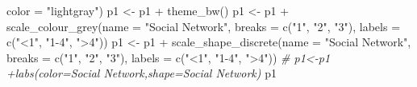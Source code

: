 \documentclass[
]{gitbook}
\newenvironment{Shaded}{\begin{snugshade}}{\end{snugshade}}
\newcommand{\AttributeTok}[1]{\textcolor[rgb]{0.77,0.63,0.00}{#1}}
\newcommand{\CommentTok}[1]{\textcolor[rgb]{0.56,0.35,0.01}{\textit{#1}}}
\newcommand{\FunctionTok}[1]{\textcolor[rgb]{0.00,0.00,0.00}{#1}}
\newcommand{\NormalTok}[1]{#1}
\newcommand{\OtherTok}[1]{\textcolor[rgb]{0.56,0.35,0.01}{#1}}
\newcommand{\SpecialCharTok}[1]{\textcolor[rgb]{0.00,0.00,0.00}{#1}}
\newcommand{\StringTok}[1]{\textcolor[rgb]{0.31,0.60,0.02}{#1}}
\begin{document}
\begin{Shaded}
\begin{Highlighting}[]
    \AttributeTok{color =} \StringTok{"lightgray"}\NormalTok{)}
\NormalTok{p1 }\OtherTok{\textless{}{-}}\NormalTok{ p1 }\SpecialCharTok{+} \FunctionTok{theme\_bw}\NormalTok{()}
\NormalTok{p1 }\OtherTok{\textless{}{-}}\NormalTok{ p1 }\SpecialCharTok{+} \FunctionTok{scale\_colour\_grey}\NormalTok{(}\AttributeTok{name =} \StringTok{"Social Network"}\NormalTok{, }\AttributeTok{breaks =} \FunctionTok{c}\NormalTok{(}\StringTok{"1"}\NormalTok{, }\StringTok{"2"}\NormalTok{, }\StringTok{"3"}\NormalTok{),}
    \AttributeTok{labels =} \FunctionTok{c}\NormalTok{(}\StringTok{"\textless{}1"}\NormalTok{, }\StringTok{"1{-}4"}\NormalTok{, }\StringTok{"\textgreater{}4"}\NormalTok{))}
\NormalTok{p1 }\OtherTok{\textless{}{-}}\NormalTok{ p1 }\SpecialCharTok{+} \FunctionTok{scale\_shape\_discrete}\NormalTok{(}\AttributeTok{name =} \StringTok{"Social Network"}\NormalTok{, }\AttributeTok{breaks =} \FunctionTok{c}\NormalTok{(}\StringTok{"1"}\NormalTok{, }\StringTok{"2"}\NormalTok{, }\StringTok{"3"}\NormalTok{),}
    \AttributeTok{labels =} \FunctionTok{c}\NormalTok{(}\StringTok{"\textless{}1"}\NormalTok{, }\StringTok{"1{-}4"}\NormalTok{, }\StringTok{"\textgreater{}4"}\NormalTok{))}
\CommentTok{\# p1\textless{}{-}p1 +labs(color=\textquotesingle{}Social Network\textquotesingle{},shape=\textquotesingle{}Social Network\textquotesingle{})}
\NormalTok{p1}
\end{Highlighting}
\end{Shaded}
\end{document}
